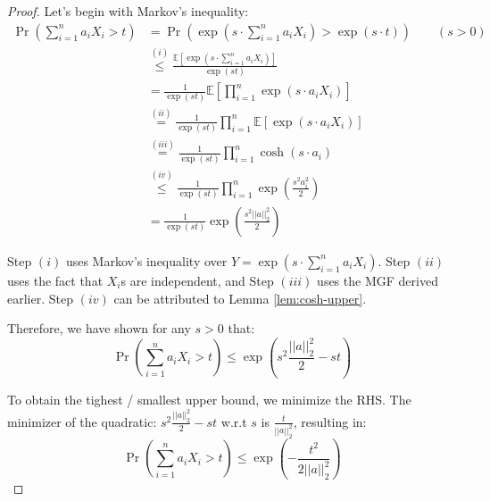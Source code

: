 \documentclass{article}
\theoremstyle{remark}
\newcommand{\Exp}{\mathbb{E}}
\begin{document}
\begin{proof}
Let's begin with Markov's inequality:
\begin{align*}
\Pr\left(\sum_{i=1}^{n} a_{i}X_{i} > t\right) &= \Pr\left(\exp\left(s \cdot \sum_{i=1}^{n} a_{i}X_{i}\right) > \exp(s \cdot t)\right) \qquad (s > 0)\\
&\overset{(i)}\leq \frac{\Exp\left[\exp\left(s \cdot \sum\limits_{i=1}^{n} a_{i}X_{i}\right)\right]}{\exp(st)} \\
&= \frac{1}{\exp(st)} \Exp\left[\prod_{i=1}^{n} \exp(s \cdot a_{i}X_{i})\right] \\
&\overset{(ii)}= \frac{1}{\exp(st)} \prod_{i=1}^{n}\Exp\left[\exp(s \cdot a_{i}X_{i})\right] \\
&\overset{(iii)}= \frac{1}{\exp(st)} \prod_{i=1}^{n}\cosh(s\cdot a_{i}) \\
&\overset{(iv)}\leq \frac{1}{\exp(st)} \prod_{i=1}^{n}\exp\left(\frac{s^{2}a_{i}^{2}}{2}\right) \\
&= \frac{1}{\exp(st)} \exp\left(\frac{s^{2}||a||_{2}^{2}}{2}\right)
\end{align*}

Step \((i)\) uses Markov's inequality over \(Y = \exp\left(s \cdot \sum\limits_{i=1}^{n} a_{i}X_{i}\right)\). Step \((ii)\) uses the fact that \(X_{i}\)s are independent, and Step \((iii)\) uses the MGF derived earlier. Step \((iv)\) can be attributed to Lemma \ref{lem:cosh-upper}.

Therefore, we have shown for any \(s > 0\) that:
\begin{equation*}
\Pr\left(\sum_{i=1}^{n} a_{i}X_{i} > t\right) \leq \exp\left(s^{2}\frac{||a||_{2}^{2}}{2} - st\right)
\end{equation*}

To obtain the tighest / smallest upper bound, we minimize the RHS. The minimizer of the quadratic: \(s^{2}\frac{||a||_{2}^{2}}{2} - st\) w.r.t \(s\) is \(\frac{t}{||a||_{2}^{2}}\), resulting in:
\begin{equation*}
\Pr\left(\sum_{i=1}^{n} a_{i}X_{i} > t\right) \leq \exp\left(-\frac{t^{2}}{2||a||_{2}^{2}}\right)
\end{equation*}
\end{proof}
\end{document}
